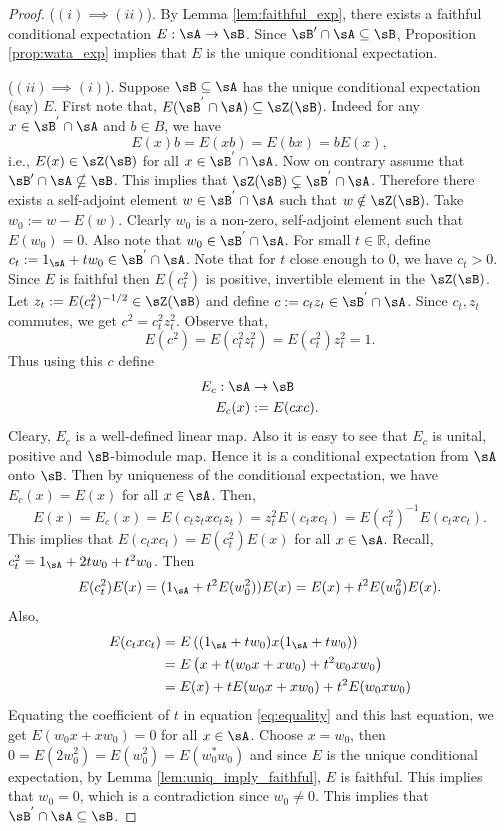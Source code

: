 \documentclass[12pt,a4paper]{amsart}
\theoremstyle{plain}
\theoremstyle{definition}
\theoremstyle{remark}
\numberwithin{equation}{section}
\theoremstyle{ser}
\theoremstyle{serr}
\theoremstyle{ser}
\theoremstyle{ser}
\theoremstyle{collabquestion}
\newcommand{\<}{\langle}
\renewcommand{\>}{\rangle}
\begin{document}
\begin{proof}
($(i) \implies (ii)$). By Lemma \ref{lem:faithful_exp}, there exists a faithful conditional expectation $E:\sA\to\sB$. Since $\sB'\cap \sA\subseteq \sB$, Proposition \ref{prop:wata_exp} implies that $E$ is the unique conditional expectation.

\noindent($(ii) \implies (i)$). Suppose $\sB\subseteq \sA$ has the unique conditional expectation (say) $E$. First note that, $E(\sB^{'}\cap \sA)\subseteq \sZ(\sB)$. Indeed for any $x\in \sB^{'}\cap \sA$ and $b\in B$, we have 
\[
E(x)b= E(xb)= E(bx)=bE(x),
\]
i.e., $E(x)\in \sZ(\sB)$ for all $x\in \sB^{'}\cap \sA$. Now on contrary assume that $\sB' \cap \sA \nsubseteq \sB$. This implies that $\sZ(\sB) \subsetneq \sB^{'}\cap \sA$. Therefore there exists a self-adjoint element $w \in \sB^{'}\cap \sA$ such that $w\notin \sZ (\sB)$. Take $w_{0}:= w- E(w)$. Clearly $w_0$ is a non-zero, self-adjoint element such that $E(w_0)=0$. Also note that $w_0\in \sB^{'}\cap \sA$. For small $t\in \mathbb{R}$, define $c_{t}:= 1_{\sA}+tw_{0} \in \sB^{'}\cap \sA$. Note that for $t$ close enough to $0$, we have $c_t>0$. Since $E$ is faithful then $E(c^{2}_{t})$ is positive, invertible element in the $\sZ(\sB)$. Let $z_{t}:= E(c^{2}_{t})^{-1/2}\in \sZ(\sB)$ and define $c:= c_{t}z_{t}\in \sB^{'}\cap \sA$. Since $c_{t}, z_{t}$ commutes, we get $c^{2}=c^{2}_{t}z^{2}_{t}$. Observe that, 
\[
E(c^2)= E(c^{2}_{t}z^{2}_{t})= E(c^{2}_{t})z^{2}_{t}=1.
\]
Thus using this $c$ define 
\begin{align*}
    E_{c}: \sA &\to \sB\\
    E_{c}(x)&:= E(cxc). 
\end{align*}
Cleary, $E_c$ is a well-defined linear map. Also it is easy to see that $E_c$ is unital, positive and  $\sB$-bimodule map. Hence it is a conditional expectation from $\sA$ onto $\sB$. Then by uniqueness of the conditional expectation, we have $E_{c}(x)= E(x)$ for all $x\in \sA$. Then,
\[
E(x)= E_{c}(x)= E(c_{t}z_{t}xc_{t}z_{t})= z^{2}_{t}E(c_{t}xc_{t})= E(c^{2}_{t})^{-1}E(c_{t}xc_{t}).
\]
This implies that $E(c_{t}xc_{t})= E(c^{2}_{t})E(x)$ for all $x\in \sA$. Recall, $c^{2}_{t}= 1_{\sA}+ 2t w_{0}+ t^{2}w_{0}$. Then 
\begin{equation}\label{eq:equality}
E(c^{2}_{t})E(x)= (1_{\sA}+t^{2}E(w^{2}_{0}))E(x)= E(x)+ t^{2}E(w^{2}_{0})E(x).    
\end{equation}
Also,
\begin{align*}
    E(c_{t}xc_{t})&= E \left((1_{\sA}+tw_{0})x (1_{\sA}+tw_{0})\right) \\
    &= E\left(x+ t(w_0x+xw_0)+t^{2}w_0xw_0 \right)\\
    &= E(x)+tE(w_0x+xw_0)+t^{2}E(w_{0}xw_0)
\end{align*}    
Equating the coefficient of $t$ in equation \ref{eq:equality} and this last equation, we get $E(w_0x+xw_0)=0$ for all $x\in \sA$. Choose $x=w_0$, then $0=E(2w^{2}_{0})= E(w^{2}_{0})=E(w^{*}_{0}w_0)$ and since $E$ is the unique conditional expectation, by Lemma \ref{lem:uniq_imply_faithful}, $E$ is faithful. This implies that $w_0=0$, which is a contradiction since $w_0\neq 0$. This implies that $\sB^{'}\cap \sA \subseteq \sB$.


\end{proof}
\end{document}
